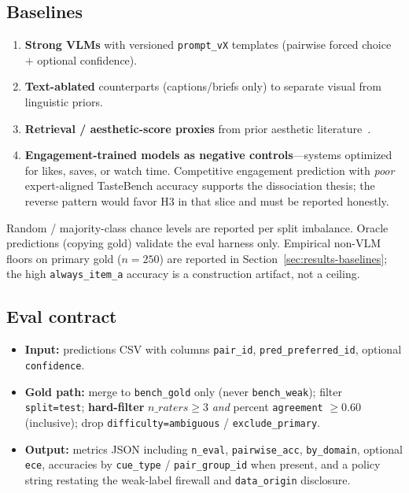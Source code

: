 \documentclass[11pt,a4paper]{article}
\begin{document}
\subsection{Baselines}

\begin{enumerate}[leftmargin=*,itemsep=2pt]
  \item \textbf{Strong VLMs} with versioned \texttt{prompt\_vX} templates (pairwise forced choice $+$ optional confidence).
  \item \textbf{Text-ablated} counterparts (captions/briefs only) to separate visual from linguistic priors.
  \item \textbf{Retrieval / aesthetic-score proxies} from prior aesthetic literature~\citep{murray2012ava,kong2016aadb}.
  \item \textbf{Engagement-trained models as negative controls}---systems optimized for likes, saves, or watch time. Competitive engagement prediction with \emph{poor} expert-aligned TasteBench accuracy supports the dissociation thesis; the reverse pattern would favor H3 in that slice and must be reported honestly.
\end{enumerate}

Random / majority-class chance levels are reported per split imbalance. Oracle predictions (copying gold) validate the eval harness only. Empirical non-VLM floors on primary gold ($n=250$) are reported in Section~\ref{sec:results-baselines}; the high \texttt{always\_item\_a} accuracy is a construction artifact, not a ceiling.

\subsection{Eval contract}

\begin{itemize}[leftmargin=*,itemsep=2pt]
  \item \textbf{Input:} predictions CSV with columns \texttt{pair\_id}, \texttt{pred\_preferred\_id}, optional \texttt{confidence}.
  \item \textbf{Gold path:} merge to \texttt{bench\_gold} only (never \texttt{bench\_weak}); filter \texttt{split=test}; \textbf{hard-filter} $n\_raters \ge 3$ \emph{and} percent \texttt{agreement} $\ge 0.60$ (inclusive); drop \texttt{difficulty=ambiguous} / \texttt{exclude\_primary}.
  \item \textbf{Output:} metrics JSON including \texttt{n\_eval}, \texttt{pairwise\_acc}, \texttt{by\_domain}, optional \texttt{ece}, accuracies by \texttt{cue\_type} / \texttt{pair\_group\_id} when present, and a policy string restating the weak-label firewall and \texttt{data\_origin} disclosure.
\end{itemize}
\end{document}
